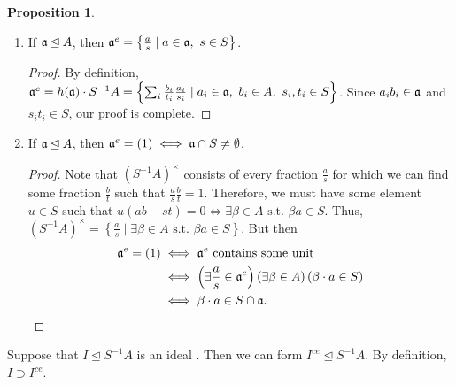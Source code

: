 \documentclass[10pt,letterpaper,cm]{nupset}
\theoremstyle{definition}
\theoremstyle{theorem}
\newtheorem{prop}[definition]{Proposition}
\theoremstyle{remark}
\newcommand{\1}{\mathbf{1}}
\newcommand{\0}{\vec 0}
\begin{document}
\begin{prop} $ $
\begin{enumerate}
\item If $\frak{a} \unlhd A$, then $\frak{a}^e = \left\{\frac{a}{s} \mid a\in \frak{a}, \ s \in S\right\}$.
\begin{proof}
By definition, $\frak{a}^e = h(\frak{a}) \cdot S^{-1}A = \left\{ \sum_{i} \frac{b_i}{t_i}\frac{a_i}{s_i} \mid a_i \in \frak{a}, \ b_i \in A, \ s_i, t_i \in S\right\}$. Since $a_ib_i \in \frak{a}$ and $s_it_i \in S$, our proof is complete.
\end{proof}
\item If $\frak{a} \unlhd A$, then $\frak{a}^e = \left(1\right) \iff \frak{a} \cap S \ne \emptyset$. 
\begin{proof}
Note that $\left(S^{-1}A\right)^{\times}$ consists of every fraction $\frac{a}{s}$ for which we can find some fraction $\frac{b}{t}$ such that $\frac{a}{s}\frac{b}{t} =1$. Therefore, we must have some element $u\in S$ such that $u(ab-st) = 0 \iff \exists \beta \in A \text{ s.t. } \beta a \in S$. Thus, $\left(S^{-1}A\right)^{\times} = \left\{\frac{a}{s} \mid \exists \beta \in A \text{ s.t. } \beta a \in S\right\}$. But then 
\begin{align*}
\frak{a}^e = \left(1\right) & \iff \frak{a}^e  \text{ contains some unit }
\\ &  \iff \left(\exists \frac{a}{s} \in \frak{a}^e\right)\left(\exists \beta \in A\right)\left(\beta \cdot a \in S\right)
\\ &  \iff \beta \cdot a \in S\cap \frak{a}.
\end{align*}
\end{proof}
\end{enumerate}
\end{prop}

\medskip


Suppose that $I \unlhd S^{-1}A$ is an ideal . Then we can form $I^{ce} \unlhd S^{-1}A$. By definition, $I \supset I^{ce}$.
\end{document}
